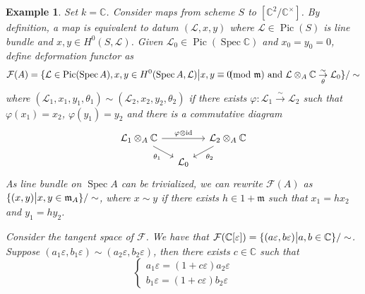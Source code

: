 \documentclass{ctexart}
\newtheorem{example}{Example}[section]
\newcommand{\identity}{\operatorname{id}}
\newcommand{\spec}{\operatorname{Spec}}
\newcommand{\picardscheme}{\operatorname{Pic}}
\begin{document}
\begin{example}
    Set $k = \mathbb{C}$.
    Consider maps from scheme $S$ to $[\mathbb{C}^{2}/\mathbb{C}^{\times}]$.
    By definition, a map is equivalent to datum $(\mathcal{L}, x, y)$ where $\mathcal{L}\in \picardscheme(S)$ is line bundle and $x,y\in H^{0}(S, \mathcal{L})$.
    Given $\mathcal{L}_{0}\in \picardscheme(\spec \mathbb{C})$ and $x_{0} = y_{0} = 0$, define deformation functor as 
    \begin{equation*}
        \mathcal{F}(A) = \{\mathcal{L}\in \picardscheme(\spec A), x,y\in H^{0}(\spec A, \mathcal{L}) \big{|} x,y \equiv 0\!\!\!\! \pmod {\mathfrak{m}} \text{ and } \mathcal{L} \otimes_{A} \mathbb{C} \underset{\theta}{\overset{\sim}{\rightarrow}} \mathcal{L}_{0}\}/\sim
    \end{equation*}
    where $(\mathcal{L}_{1}, x_{1}, y_{1}, \theta_{1}) \sim (\mathcal{L}_{2}, x_{2}, y_{2}, \theta_{2})$ if there exists $\varphi: \mathcal{L}_{1} \overset{\sim}{\rightarrow} \mathcal{L}_{2}$ such that $\varphi(x_{1}) = x_{2}$, $\varphi(y_{1}) = y_{2}$ and there is a commutative diagram
    \begin{equation}
        \begin{tikzcd}[sep = small]
            \mathcal{L}_{1} \otimes_{A} \mathbb{C} \arrow[rr, "\varphi \otimes \identity"] \arrow[dr, "\theta_{1}" swap] &&
            \mathcal{L}_{2} \otimes_{A} \mathbb{C} \arrow[dl, "\theta_{2}"] \\
            & \mathcal{L}_{0} &
        \end{tikzcd}
    \end{equation}
    As line bundle on $\spec A$ can be trivialized, we can rewrite $\mathcal{F}(A)$ as $\{(x, y) \big{|} x,y\in \mathfrak{m}_{A}\}/\sim$,
    where $x \sim y$ if there exists $h\in 1 + \mathfrak{m}$ such that $x_{1} = hx_{2}$ and $y_{1} = hy_{2}$.
    \par
    Consider the tangent space of $\mathcal{F}$.
    We have that $\mathcal{F}(\mathbb{C}[\varepsilon]) = \{(a\varepsilon, b\varepsilon) \big{|} a,b\in \mathbb{C}\}/\sim$.
    Suppose $(a_{1}\varepsilon, b_{1}\varepsilon) \sim (a_{2}\varepsilon, b_{2}\varepsilon)$, then there exists $c\in \mathbb{C}$ such that
    \begin{equation}
        \left\{
            \begin{aligned}
                a_{1}\varepsilon = (1 + c\varepsilon)a_{2}\varepsilon \\
                b_{1}\varepsilon = (1 + c\varepsilon)b_{2}\varepsilon 
            \end{aligned}

\end{equation}
\end{example}
\end{document}
